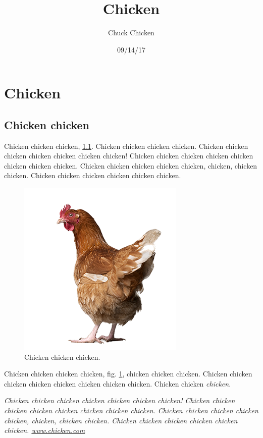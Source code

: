\documentclass[a4paper,10pt]{article}
\author{Chuck Chicken}
\title{Chicken}
\date{09/14/17}
\begin{document}
\maketitle

\section{Chicken}\label{sec:Section}

\subsection{Chicken chicken}\label{subsec:Chicken}
Chicken chicken chicken, \ref{subsec:Chicken}. Chicken chicken chicken chicken.
Chicken chicken chicken chicken chicken chicken chicken! Chicken chicken chicken chicken chicken chicken chicken chicken.
Chicken chicken chicken chicken chicken, chicken, chicken chicken. Chicken chicken chicken chicken chicken chicken.

\begin{figure}[H]
    \centering
    \includegraphics{chicken.png}
    \caption{Chicken chicken chicken.\label{fig:Chicken}}
\end{figure}
Chicken chicken chicken chicken, fig. \ref{fig:Chicken}, chicken chicken chicken. 
Chicken chicken chicken chicken chicken chicken chicken chicken. Chicken chicken \textit{chicken}.

\begin{center}\textit{
  Chicken chicken chicken chicken chicken chicken chicken! Chicken chicken chicken chicken chicken chicken chicken chicken.
  Chicken chicken chicken chicken chicken, chicken, chicken chicken. Chicken chicken chicken chicken chicken chicken.
  \url{www.chicken.com}
}\end{center}
\end{document}
